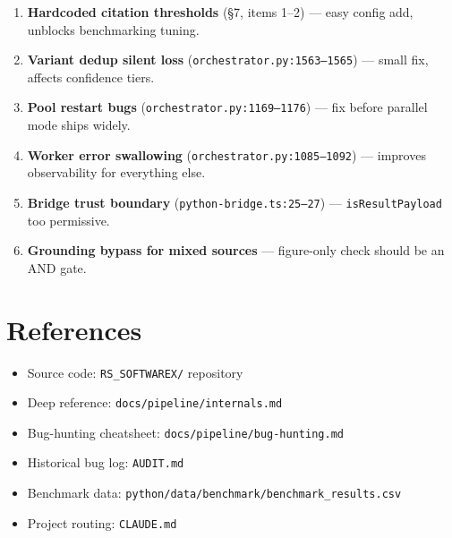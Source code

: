 \documentclass[11pt,a4paper]{article}
\begin{document}
\begin{enumerate}[itemsep=2pt]
\item \textbf{Hardcoded citation thresholds} (\S7, items 1--2) --- easy config add, unblocks benchmarking tuning.
\item \textbf{Variant dedup silent loss} (\texttt{orchestrator.py:1563--1565}) --- small fix, affects confidence tiers.
\item \textbf{Pool restart bugs} (\texttt{orchestrator.py:1169--1176}) --- fix before parallel mode ships widely.
\item \textbf{Worker error swallowing} (\texttt{orchestrator.py:1085--1092}) --- improves observability for everything else.
\item \textbf{Bridge trust boundary} (\texttt{python-bridge.ts:25--27}) --- \texttt{isResultPayload} too permissive.
\item \textbf{Grounding bypass for mixed sources} --- figure-only check should be an AND gate.
\end{enumerate}

\section*{References}

\begin{itemize}[leftmargin=2em,itemsep=2pt]
\item Source code: \texttt{RS\_SOFTWAREX/} repository
\item Deep reference: \texttt{docs/pipeline/internals.md}
\item Bug-hunting cheatsheet: \texttt{docs/pipeline/bug-hunting.md}
\item Historical bug log: \texttt{AUDIT.md}
\item Benchmark data: \texttt{python/data/benchmark/benchmark\_results.csv}
\item Project routing: \texttt{CLAUDE.md}
\end{itemize}
\end{document}

